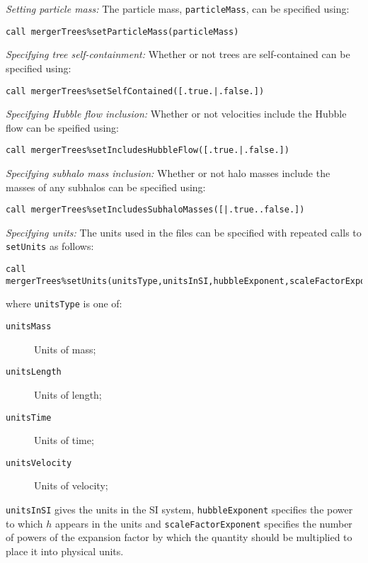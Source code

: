 \noindent \emph{Setting particle mass:} The particle mass, {\tt particleMass}, can be specified using:
\begin{verbatim}
call mergerTrees%setParticleMass(particleMass)
\end{verbatim}

\noindent \emph{Specifying tree self-containment:} Whether or not trees are self-contained can be specified using:
\begin{verbatim}
call mergerTrees%setSelfContained([.true.|.false.])
\end{verbatim}

\noindent \emph{Specifying Hubble flow inclusion:} Whether or not velocities include the Hubble flow can be speified using:
\begin{verbatim}
call mergerTrees%setIncludesHubbleFlow([.true.|.false.])
\end{verbatim}

\noindent \emph{Specifying subhalo mass inclusion:} Whether or not halo masses include the masses of any subhalos can be specified using:
\begin{verbatim}
call mergerTrees%setIncludesSubhaloMasses([|.true..false.])
\end{verbatim}

\noindent \emph{Specifying units:} The units used in the files can be specified with repeated calls to {\tt setUnits} as follows:
\begin{verbatim}
call mergerTrees%setUnits(unitsType,unitsInSI,hubbleExponent,scaleFactorExponent)
\end{verbatim}
where {\tt unitsType} is one of:
\begin{description}
 \item [{\tt unitsMass}] Units of mass;
 \item [{\tt unitsLength}] Units of length;
 \item [{\tt unitsTime}] Units of time;
 \item [{\tt unitsVelocity}] Units of velocity;
\end{description}
{\tt unitsInSI} gives the units in the SI system, {\tt hubbleExponent} specifies the power to which $h$ appears in the units and {\tt scaleFactorExponent} specifies the number of powers of the expansion factor by which the quantity should be multiplied to place it into physical units.\\

